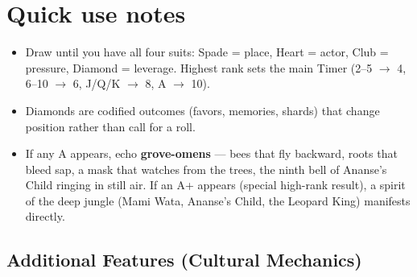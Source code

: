 \section*{Quick use notes}
\label{sec:sekogo-quick-use}
\begin{itemize}
\item Draw until you have all four suits: Spade = place, Heart = actor, Club = pressure, Diamond = leverage. Highest rank sets the main Timer (2--5 $\rightarrow$ 4, 6--10 $\rightarrow$ 6, J/Q/K $\rightarrow$ 8, A $\rightarrow$ 10).
\item Diamonds are codified outcomes (favors, memories, shards) that change position rather than call for a roll.
\item If any A appears, echo \textbf{grove-omens} --- bees that fly backward, roots that bleed sap, a mask that watches from the trees, the ninth bell of Ananse's Child ringing in still air. If an A+ appears (special high-rank result), a spirit of the deep jungle (Mami Wata, Ananse's Child, the Leopard King) manifests directly.
\end{itemize}

\subsection*{Additional Features (Cultural Mechanics)}
\label{sec:sekogo-mechanics}

